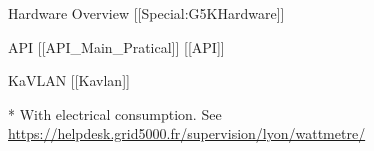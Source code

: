 \documentclass[final]{beamer}
\newlength{\sepwid}
\newlength{\twocolwid}
\newlength{\threecolwid}
\begin{document}
\begin{frame}[t]
\begin{columns}[t]
\begin{column}{\twocolwid} %



\begin{alertblock}{Hardware Overview [[Special:G5KHardware]]}

\end{alertblock}



\begin{alertblock}{API [[API\_Main\_Pratical]] [[API]]}

\end{alertblock}



\begin{alertblock}{KaVLAN [[Kavlan]]}

\end{alertblock}


* With electrical consumption.
See \url{https://helpdesk.grid5000.fr/supervision/lyon/wattmetre/}
\end{column} %

\begin{column}{\sepwid}\end{column} %

\begin{column}{\threecolwid} %



\end{column}
\end{columns}
\end{frame}
\end{document}
